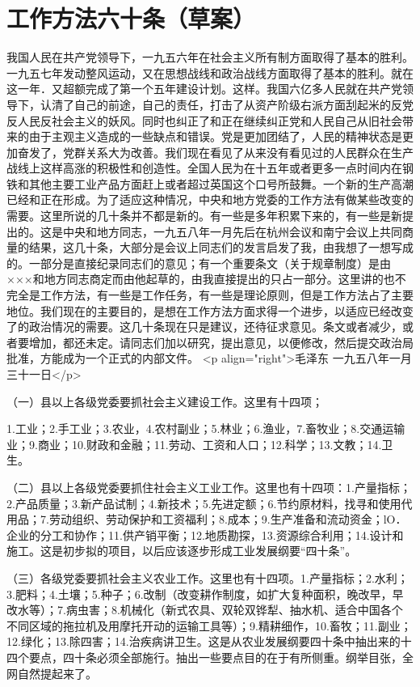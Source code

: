\section[工作方法六十条（草案）（一九五八年一月三十一日）]{工作方法六十条（草案）}


我国人民在共产党领导下，一九五六年在社会主义所有制方面取得了基本的胜利。一九五七年发动整风运动，又在思想战线和政治战线方面取得了基本的胜利。就在这一年．又超额完成了第一个五年建设计划。这样。我国六亿多人民就在共产党领导下，认清了自己的前途，自己的责任，打击了从资产阶级右派方面刮起米的反党反人民反社会主义的妖风。同时也纠正了和正在继续纠正党和人民自己从旧社会带来的由于主观主义造成的一些缺点和错误。党是更加团结了，人民的精神状态是更加奋发了，党群关系大为改善。我们现在看见了从来没有看见过的人民群众在生产战线上这样高涨的积极性和创造性。全国人民为在十五年或者更多一点时间内在钢铁和其他主要工业产品方面赶上或者超过英国这个口号所鼓舞。一个新的生产高潮已经和正在形成。为了适应这种情况，中央和地方党委的工作方法有做某些改变的需要。这里所说的几十条并不都是新的。有一些是多年积累下来的，有一些是新提出的。这是中央和地方同志，一九五八年一月先后在杭州会议和南宁会议上共同商量的结果，这几十条，大部分是会议上同志们的发言启发了我，由我想了一想写成的。一部分是直接纪录同志们的意见；有一个重要条文（关于规章制度）是由×××和地方同志商定而由他起草的，由我直接提出的只占一部分。这里讲的也不完全是工作方法，有一些是工作任务，有一些是理论原则，但是工作方法占了主要地位。我们现在的主要目的，是想在工作方法方面求得一个进步，以适应已经改变了的政治情况的需要。这几十条现在只是建议，还待征求意见。条文或者减少，或者要增加，都还未定。请同志们加以研究，提出意见，以便修改，然后提交政治局批准，方能成为一个正式的内部文件。
<p align="right">毛泽东
一九五八年一月三十一日</p>

（一）县以上各级党委要抓社会主义建设工作。这里有十四项；

1.工业；2.手工业；3.农业，4.农村副业；5.林业；6.渔业，7.畜牧业；8.交通运输业；9.商业；10.财政和金融；11.劳动、工资和人口；12.科学；13.文教；14.卫生。

（二）县以上各级党委要抓住社会主义工业工作。这里也有十四项：1.产量指标；2.产品质量；3.新产品试制；4.新技术；5.先进定额；6.节约原材料，找寻和使用代用品；7.劳动组织、劳动保护和工资福利；8.成本；9.生产准备和流动资金；lO．企业的分工和协作；11.供产销平衡；12.地质勘探，13.资源综合利用；14.设计和施工。这是初步拟的项目，以后应该逐步形成工业发展纲要“四十条”。

（三）各级党委要抓社会主义农业工作。这里也有十四项。1.产量指标；2.水利；3.肥料；4.土壤；5.种子；6.改制（改变耕作制度，如扩大复种面积，晚改早，早改水等）；7.病虫害；8.机械化（新式农具、双轮双铧犁、抽水机、适合中国各个不同区域的拖拉机及用摩托开动的运输工具等）；9.精耕细作，10.畜牧；11.副业；12.绿化；13.除四害；14.治疾病讲卫生。这是从农业发展纲要四十条中抽出来的十四个要点，四十条必须全部施行。抽出一些要点目的在于有所侧重。纲举目张，全网自然提起来了。

